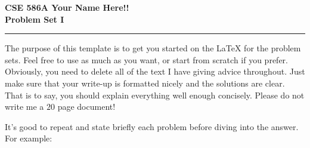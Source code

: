 \documentclass[11pt]{article}
\begin{document}
\thispagestyle{empty}
{\large{\bf CSE 586A  \hfill Your Name Here!!}}\\

{\LARGE{\bf Problem Set I}}
\vspace{0.2\baselineskip}
\hrule

The purpose of this template is to get you started on the LaTeX for the problem sets. 
Feel free to use as much as you want, or start from scratch if you prefer. Obviously, you
need to delete all of the text I have giving advice throughout. Just make sure that your
write-up is formatted nicely and the solutions are clear. That is to say, you should explain everything
well enough concisely. Please do not write me a $20$ page document!

It's good to repeat and state briefly each problem before diving into the answer. For example:
\end{document}
